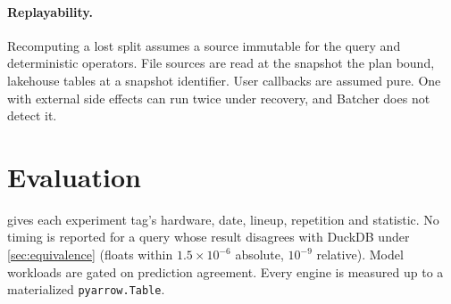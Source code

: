 \documentclass[10pt,twocolumn,letterpaper]{article}   %
\newcommand{\sys}{Batcher}
\begin{document}
\paragraph{Replayability.} Recomputing a lost split assumes a source immutable for the query
and deterministic operators. File sources are read at the snapshot the plan bound, lakehouse
tables at a snapshot identifier. User callbacks are assumed pure. One with external side
effects can run twice under recovery, and \sys{} does not detect it.

\section{Evaluation}
\label{sec:eval}

 gives each experiment tag's hardware, date, lineup, repetition and
statistic. No timing is reported for a query whose result disagrees with DuckDB under
\cref{sec:equivalence} (floats within $1.5\times10^{-6}$ absolute, $10^{-9}$ relative). Model
workloads are gated on prediction agreement. Every engine is measured up to a materialized \texttt{pyarrow.Table}.
\end{document}

